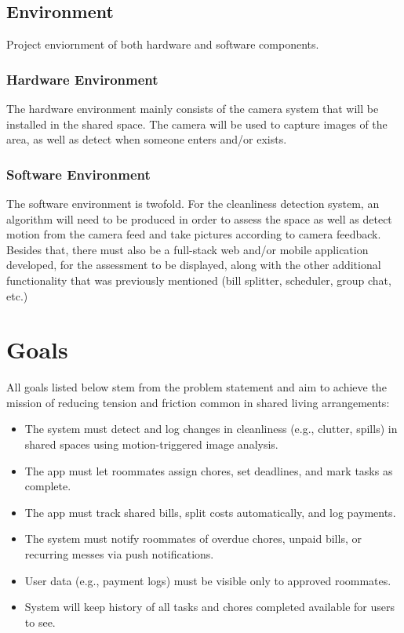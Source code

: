 \documentclass[12pt, titlepage]{article}
\begin{document}
\subsection{Environment}
Project enviornment of both hardware and software components.

\subsubsection{Hardware Environment}
The hardware environment mainly consists of the camera system that will be
installed in the shared space. The camera will be used to capture images of the area, as well as detect when someone enters and/or exists.
\subsubsection{Software Environment}
The software environment is twofold. For the cleanliness detection system, an algorithm will need to be produced in order to assess the space as well as detect motion from the camera feed and take pictures according to camera feedback. Besides that, there must also be a full-stack web and/or mobile application developed, for the assessment to be displayed, along with the other additional functionality that was previously mentioned (bill splitter, scheduler, group chat, etc.)


\section{Goals}
All goals listed below stem from the problem statement and aim to achieve the mission of reducing tension and friction common in shared living arrangements:
\begin{itemize}
\item The system must detect and log changes in cleanliness (e.g., clutter, spills) in shared spaces using motion-triggered image analysis.
\item The app must let roommates assign chores, set deadlines, and mark tasks as complete.
\item The app must track shared bills, split costs automatically, and log payments.
\item The system must notify roommates of overdue chores, unpaid bills, or recurring messes via push notifications. 
\item User data (e.g., payment logs) must be visible only to approved roommates.
\item System will keep history of all tasks and chores completed available for users to see.
\end{itemize}
\end{document}
